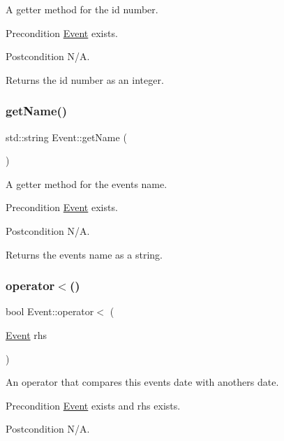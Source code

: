 A getter method for the id number. \begin{DoxyPrecond}{Precondition}
\mbox{\hyperlink{class_event}{Event}} exists. 
\end{DoxyPrecond}
\begin{DoxyPostcond}{Postcondition}
N/A. 
\end{DoxyPostcond}
\begin{DoxyReturn}{Returns}
the id number as an integer. 
\end{DoxyReturn}
\mbox{\label{class_event_adf0f3e50061123d6f24200661eeb66eb}} 
\subsubsection{\texorpdfstring{get\+Name()}{getName()}}
{\footnotesize\ttfamily std\+::string Event\+::get\+Name (\begin{DoxyParamCaption}{ }\end{DoxyParamCaption})}

A getter method for the event\textquotesingle{}s name. \begin{DoxyPrecond}{Precondition}
\mbox{\hyperlink{class_event}{Event}} exists. 
\end{DoxyPrecond}
\begin{DoxyPostcond}{Postcondition}
N/A. 
\end{DoxyPostcond}
\begin{DoxyReturn}{Returns}
the event\textquotesingle{}s name as a string. 
\end{DoxyReturn}
\mbox{\label{class_event_a8246f658d031aac8fb87cf9ab25d6047}} 
\subsubsection{\texorpdfstring{operator$<$()}{operator<()}}
{\footnotesize\ttfamily bool Event\+::operator$<$ (\begin{DoxyParamCaption}\item[{\mbox{\hyperlink{class_event}{Event}}}]{rhs }\end{DoxyParamCaption})}

An operator that compares this event\textquotesingle{}s date with another\textquotesingle{}s date. \begin{DoxyPrecond}{Precondition}
\mbox{\hyperlink{class_event}{Event}} exists and rhs exists. 
\end{DoxyPrecond}
\begin{DoxyPostcond}{Postcondition}
N/A. 
\end{DoxyPostcond}

